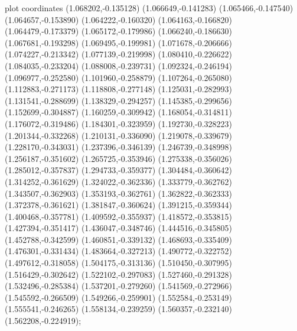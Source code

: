{ plot coordinates {(1.068202,-0.135128) (1.066649,-0.141283) (1.065466,-0.147540) (1.064657,-0.153890) (1.064222,-0.160320) (1.064163,-0.166820) (1.064479,-0.173379) (1.065172,-0.179986) (1.066240,-0.186630) (1.067681,-0.193298) (1.069495,-0.199981) (1.071678,-0.206666) (1.074227,-0.213342) (1.077139,-0.219998) (1.080410,-0.226622) (1.084035,-0.233204) (1.088008,-0.239731) (1.092324,-0.246194) (1.096977,-0.252580) (1.101960,-0.258879) (1.107264,-0.265080) (1.112883,-0.271173) (1.118808,-0.277148) (1.125031,-0.282993) (1.131541,-0.288699) (1.138329,-0.294257) (1.145385,-0.299656) (1.152699,-0.304887) (1.160259,-0.309942) (1.168054,-0.314811) (1.176072,-0.319486) (1.184301,-0.323959) (1.192730,-0.328223) (1.201344,-0.332268) (1.210131,-0.336090) (1.219078,-0.339679) (1.228170,-0.343031) (1.237396,-0.346139) (1.246739,-0.348998) (1.256187,-0.351602) (1.265725,-0.353946) (1.275338,-0.356026) (1.285012,-0.357837) (1.294733,-0.359377) (1.304484,-0.360642) (1.314252,-0.361629) (1.324022,-0.362336) (1.333779,-0.362762) (1.343507,-0.362903) (1.353193,-0.362761) (1.362822,-0.362333) (1.372378,-0.361621) (1.381847,-0.360624) (1.391215,-0.359344) (1.400468,-0.357781) (1.409592,-0.355937) (1.418572,-0.353815) (1.427394,-0.351417) (1.436047,-0.348746) (1.444516,-0.345805) (1.452788,-0.342599) (1.460851,-0.339132) (1.468693,-0.335409) (1.476301,-0.331434) (1.483664,-0.327213) (1.490772,-0.322752) (1.497612,-0.318058) (1.504175,-0.313136) (1.510450,-0.307995) (1.516429,-0.302642) (1.522102,-0.297083) (1.527460,-0.291328) (1.532496,-0.285384) (1.537201,-0.279260) (1.541569,-0.272966) (1.545592,-0.266509) (1.549266,-0.259901) (1.552584,-0.253149) (1.555541,-0.246265) (1.558134,-0.239259) (1.560357,-0.232140) (1.562208,-0.224919)};
}
